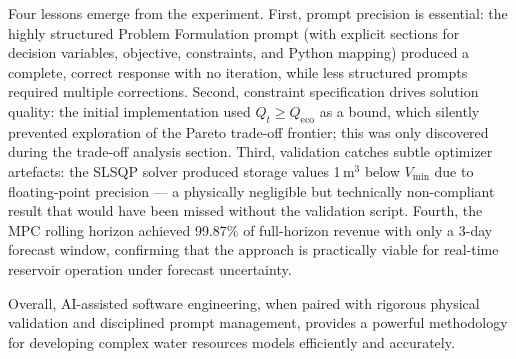 \documentclass[12pt, a4paper]{article}
\begin{document}
Four lessons emerge from the experiment. First, prompt precision is essential: the highly structured Problem Formulation prompt (with explicit sections for decision variables, objective, constraints, and Python mapping) produced a complete, correct response with no iteration, while less structured prompts required multiple corrections. Second, constraint specification drives solution quality: the initial implementation used $Q_t \geq Q_{\text{eco}}$ as a bound, which silently prevented exploration of the Pareto trade-off frontier; this was only discovered during the trade-off analysis section. Third, validation catches subtle optimizer artefacts: the SLSQP solver produced storage values 1\,m$^3$ below $V_{\min}$ due to floating-point precision — a physically negligible but technically non-compliant result that would have been missed without the validation script. Fourth, the MPC rolling horizon achieved 99.87\% of full-horizon revenue with only a 3-day forecast window, confirming that the approach is practically viable for real-time reservoir operation under forecast uncertainty.

Overall, AI-assisted software engineering, when paired with rigorous physical validation and disciplined prompt management, provides a powerful methodology for developing complex water resources models efficiently and accurately.
\end{document}
